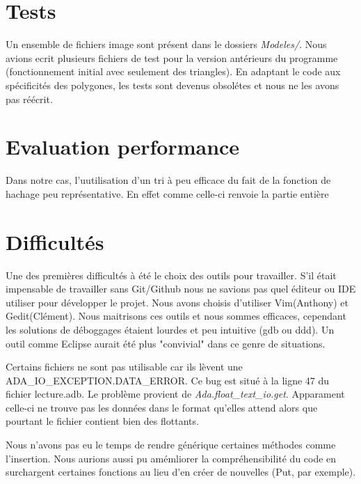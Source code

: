 \documentclass[a4paper,11pt]{article}
\theoremstyle{mytheor}
\begin{document}
\section*{Tests}
Un ensemble de fichiers image sont présent dans le dossiers \textit{Modeles/}.
Nous avions ecrit plusieurs fichiers de test pour la version antérieurs du programme (fonctionnement initial avec seulement des triangles). En adaptant le code aux spécificités des polygones, les tests sont devenus obsolétes et nous ne les avons pas réécrit.

\section*{Evaluation performance}

Dans notre cas, l'uutilisation d'un tri à peu efficace du fait de la fonction de hachage peu représentative. En effet comme celle-ci renvoie la partie entière 

\section*{Difficultés}
Une des premières difficultés à été le choix des outils pour travailler. S'il était impensable de travailler sans Git/Github nous ne savions pas quel éditeur ou IDE utiliser pour développer le projet. Nous avons choisis d'utiliser Vim(Anthony) et Gedit(Clément). Nous maitrisons ces outils et nous sommes efficaces, cependant les solutions de déboggages étaient lourdes et peu intuitive (gdb ou ddd). Un outil comme Eclipse aurait été plus "convivial" dans ce genre de situations. 

Certains fichiers ne sont pas utilisable car ils lèvent une ADA\_IO\_EXCEPTION.DATA\_ERROR. Ce bug est situé à la ligne 47 du fichier lecture.adb. Le problème provient de \textit{Ada.float\_text\_io.get}. Apparament celle-ci ne trouve pas les données dans le format qu'elles attend alors que pourtant le fichier contient bien des flottants. 

Nous n'avons pas eu le temps de rendre générique certaines méthodes comme l'insertion. Nous aurions aussi pu amémliorer la compréhensibilité du code en surchargent certaines fonctions au lieu d'en créer de nouvelles (Put, par exemple).
\end{document}
